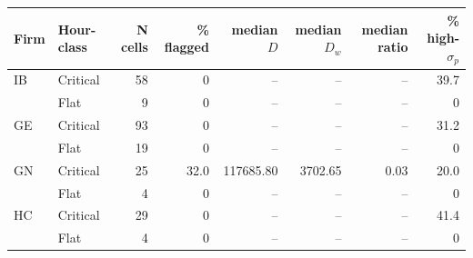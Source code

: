 \begin{tabular}{@{}l l r r r r r r@{}}
\toprule
Firm & Hour-class & N cells & \% flagged & median $D$ & median $D_w$ & median ratio & \% high-$\sigma_{p}$ \\
\midrule
IB & Critical & 58 & 0 & -- & -- & -- & 39.7 \\
 & Flat & 9 & 0 & -- & -- & -- & 0 \\
GE & Critical & 93 & 0 & -- & -- & -- & 31.2 \\
 & Flat & 19 & 0 & -- & -- & -- & 0 \\
GN & Critical & 25 & 32.0 & 117685.80 & 3702.65 & 0.03 & 20.0 \\
 & Flat & 4 & 0 & -- & -- & -- & 0 \\
HC & Critical & 29 & 0 & -- & -- & -- & 41.4 \\
 & Flat & 4 & 0 & -- & -- & -- & 0 \\
\bottomrule
\end{tabular}

